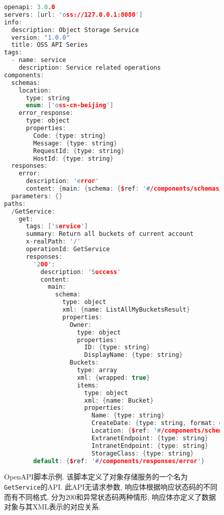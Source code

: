         \begin{figure}[!htb]
            \centering
            \scriptsize
            \tt
            
                \begin{lstlisting}[language=C++]
openapi: 3.0.0
servers: [url: 'oss://127.0.0.1:8080']
info:
  description: Object Storage Service
  version: "1.0.0"
  title: OSS API Series
tags:
  - name: service
    description: Service related operations
components:
  schemas:
    location:
      type: string
      enum: ['oss-cn-beijing']
    error_response:
      type: object
      properties:
        Code: {type: string}
        Message: {type: string}
        RequestId: {type: string}
        HostId: {type: string}
  responses:
    error:
      description: 'error'
      content: {main: {schema: {$ref: '#/components/schemas/error_response'}}}
  parameters: {}
paths:
  /GetService:
    get:
      tags: ['service']
      summary: Return all buckets of current account
      x-realPath: '/'
      operationId: GetService
      responses:
        '200':
          description: 'Success'
          content:
            main:
              schema:
                type: object
                xml: {name: ListAllMyBucketsResult}
                properties:
                  Owner:
                    type: object
                    properties:
                      ID: {type: string}
                      DisplayName: {type: string}
                  Buckets:
                    type: array
                    xml: {wrapped: true}
                    items:
                      type: object
                      xml: {name: Bucket}
                      properties:
                        Name: {type: string}
                        CreateDate: {type: string, format: date-time}
                        Location: {$ref: '#/components/schemas/location'}
                        ExtranetEndpoint: {type: string}
                        IntranetEndpoint: {type: string}
                        StorageClass: {type: string}
        default: {$ref: '#/components/responses/error'}
                \end{lstlisting}
            
            \caption{OpenAPI脚本示例. 该脚本定义了对象存储服务的一个名为\texttt{GetService}的API. 此API无请求参数, 响应体根据响应状态码的不同而有不同格式, 分为200和异常状态码两种情形, 响应体亦定义了数据对象与其XML表示的对应关系.}
            \label{fig:openapi_example}
        \end{figure}
        
